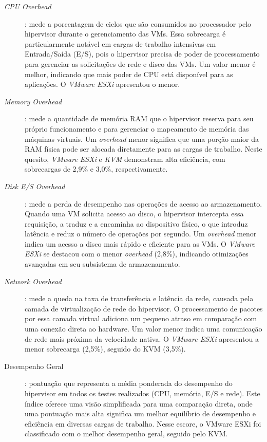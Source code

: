 \begin{description}
    \item[\textit{CPU Overhead}]:  mede a porcentagem de ciclos que são consumidos no processador pelo hipervisor durante o gerenciamento das VMs. Essa sobrecarga é particularmente notável em cargas de trabalho intensivas em Entrada/Saída (E/S), pois o hipervisor precisa de poder de processamento para gerenciar as solicitações de rede e disco das VMs. Um valor menor é melhor, indicando que mais poder de CPU está disponível para as aplicações. O \textit{VMware ESXi} apresentou o menor.
    \item[\textit{Memory Overhead}]:  mede a quantidade de memória RAM que o hipervisor reserva para seu próprio funcionamento e para gerenciar o mapeamento de memória das máquinas virtuais. Um \textit{overhead} menor significa que uma porção maior da RAM física pode ser alocada diretamente para as cargas de trabalho. Neste quesito, \textit{VMware ESXi} e \textit{KVM} demonstram alta eficiência, com sobrecargas de 2,9\% e 3,0\%, respectivamente.
    \item[\textit{Disk E/S Overhead}]: mede a perda de desempenho nas operações de acesso ao armazenamento. Quando uma VM solicita acesso ao disco, o hipervisor intercepta essa requisição, a traduz e a encaminha ao dispositivo físico, o que introduz latência e reduz o número de operações por segundo. Um \textit{overhead} menor indica um acesso a disco mais rápido e eficiente para as VMs. O \textit{VMware ESXi} se destacou com o menor \textit{overhead} (2,8\%), indicando otimizações avançadas em seu subsistema de armazenamento.
    \item[\textit{Network Overhead}]: mede a queda na taxa de transferência e latência da rede, causada pela camada de virtualização de rede do hipervisor. O processamento de pacotes por essa camada virtual adiciona um pequeno atraso em comparação com uma conexão direta ao hardware. Um valor menor indica uma comunicação de rede mais próxima da velocidade nativa. O \textit{VMware ESXi} apresentou a menor sobrecarga (2,5\%), seguido do KVM (3,5\%).
    \item[Desempenho Geral]: pontuação que representa a média ponderada do desempenho do hipervisor em todos os testes realizados (CPU, memória, E/S e rede). Este índice oferece uma visão simplificada para uma comparação direta, onde uma pontuação mais alta significa um melhor equilíbrio de desempenho e eficiência em diversas cargas de trabalho. Nesse escore, o VMware ESXi foi classificado com o melhor desempenho geral, seguido pelo KVM.
\end{description}

